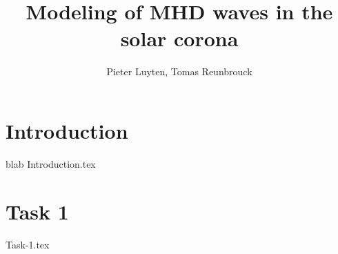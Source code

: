 \documentclass[a4paper, 11pt]{article}
\title{Modeling of MHD waves in the solar corona}
\author{Pieter Luyten, Tomas Reunbrouck}
\begin{document}
\maketitle
\newpage
\tableofcontents
\newpage

\section{Introduction}
blab
{Introduction.tex}
\cite{notes-fluid-dynamics}

\section{Task 1}
{Task-1.tex}

\printbibliography
\end{document}
